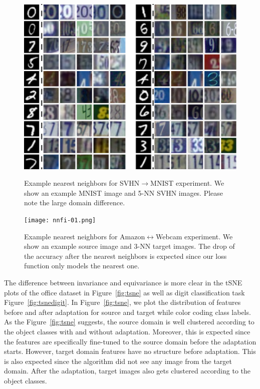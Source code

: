 \begin{figure}[ht]
\begin{small}
\includegraphics[width=\columnwidth]{nndig}
\vspace{-5mm}
\caption{Example nearest neighbors for SVHN$\rightarrow$MNIST experiment. We show an example MNIST image and 5-NN SVHN images. Please note the large domain difference.}
\label{fig:nn}
\texttt{[image: nnfi-01.png]}
\caption{Example nearest neighbors for Amazon$\leftrightarrow$Webcam experiment. We show an example source image and 3-NN target images. The drop of the accuracy after the nearest neighbors is expected since our loss function only models the nearest one.}
\label{fig:nnoffice}
\end{small}
\end{figure}

The difference between invariance and equivariance is more clear in the tSNE plots of the office dataset in Figure~\ref{fig:tsne} as well as digit classification task Figure~\ref{fig:tsnedigit}. In Figure~\ref{fig:tsne}, we plot the distribution of features before and after adaptation for source and target while color coding class labels. As the Figure~\ref{fig:tsne} suggests, the source domain is well clustered according to the object classes with and without adaptation. Moreover, this is expected since the features are specifically fine-tuned to the source domain before the adaptation starts. However, target domain features have no structure before adaptation. This is also expected since the algorithm did not see any image from the target domain. After the adaptation, target images also gets clustered according to the object classes. 

